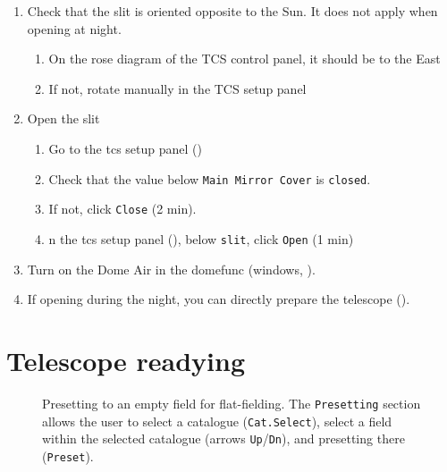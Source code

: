 \documentclass[11pt,fleqn,a4paper]{book}
\begin{document}
\label{proc:open}
\begin{enumerate}
\item Check that the \gls{slit} is oriented opposite to the Sun. It does not apply when opening at night.
        \begin{enumerate}
            \item On the \gls{rose diagram} of the \gls{TCS control panel}, it should be to the East
            \item If not, rotate manually in the \gls{TCS setup panel}
        \end{enumerate}
\item Open the \gls{slit}\label{list:slitopen}
         \begin{enumerate}
           \item Go to the \gls{tcs} setup panel ()
           \item Check that the value below \texttt{Main Mirror Cover} is \texttt{closed}.
           \item If not, click \texttt{Close} (2 min).
           \item n the \gls{tcs} setup panel (), below \texttt{slit}, click \texttt{Open} (1 min)
         \end{enumerate} 
\item Turn on the Dome Air in the \gls{domefunc} (\gls{windows}, ).
\item If opening during the night, you can directly prepare the telescope ().
\end{enumerate}

\section{Telescope readying}

\begin{figure*}
\centering
{}%
\hspace{0.1\linewidth}%
%
\caption[Presetting to an empty field for flat-fielding]{Presetting to an empty field for flat-fielding.  The \texttt{Presetting} section allows the user to select a catalogue (\texttt{Cat.Select}), select a field within the selected catalogue (arrows \texttt{Up}/\texttt{Dn}), and presetting there (\texttt{Preset}).}
\label{fig:emptyfield}
\end{figure*}
\end{document}
